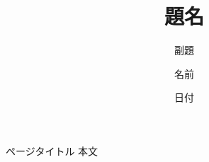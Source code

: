 \documentclass[dvipdfmx,10pt,notheorems]{beamer}
\title{題名}
\subtitle{副題}
\author{名前}
\institute{所属}
\date{日付}%
\theoremstyle{definition}
\begin{document}
\begin{frame}
\titlepage
\end{frame}


\begin{frame}{ページタイトル}
本文
\end{frame}
\end{document}
